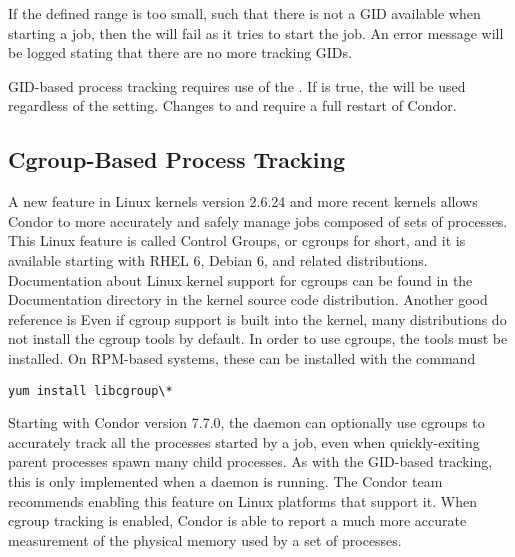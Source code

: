 If the defined range is too small, such that there is not a GID available
when starting a job,
then the  will fail as it tries to start the job.
An error message will be logged stating that there are no more tracking GIDs.

GID-based process tracking requires use of the . If
 is true, the  will
be used regardless of the  setting.  Changes to
 and  require
a full restart of Condor.

\subsection{\label{sec:CGroupTracking}Cgroup-Based Process Tracking} 

A new feature in Linux kernels version 2.6.24 and more recent kernels
allows Condor to
more accurately and safely manage jobs composed of sets of processes.
This Linux feature is called Control Groups, or cgroups for short, and 
it is available starting with RHEL 6, Debian 6, and related distributions.  
Documentation about Linux kernel support for cgroups can be found in
the Documentation directory in the kernel source code distribution.
Another good reference is 
Even if cgroup support is built into the kernel, 
many distributions do not install the cgroup tools by default.
In order to use cgroups, 
the tools must be installed.  
On RPM-based systems, these can be installed with the command

\begin{verbatim}
yum install libcgroup\*
\end{verbatim}

Starting with Condor version 7.7.0, 
the  daemon can optionally use cgroups
to accurately track all the processes started by a job, 
even when quickly-exiting parent processes spawn many child processes.
As with the GID-based tracking, 
this is only implemented when a  daemon is running.
The Condor team recommends enabling this feature on Linux platforms 
that support it.
When cgroup tracking is enabled, 
Condor is able to report a much more accurate
measurement of the physical memory used by a set of processes.

